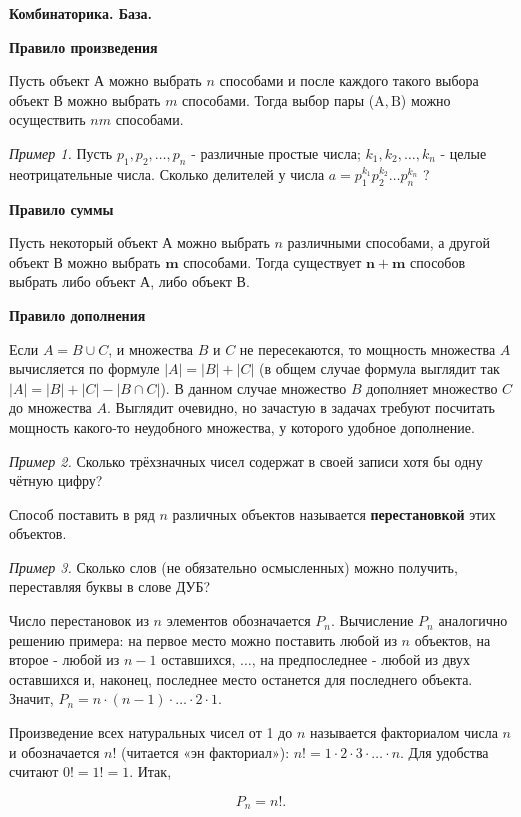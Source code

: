 \centerline{\bf \Huge Комбинаторика. База.}


\textbf{Правило произведения}

Пусть объект А можно выбрать $n$ способами и после каждого такого выбора объект В можно выбрать $m$ способами. Тогда выбор пары ($\mathrm{A}, \mathrm{B}$) можно осуществить $n m$ способами.

\textit{Пример 1.}
Пусть $p_1, p_2, \ldots, p_n$ - различные простые числа; $k_1, k_2, \ldots, k_n$ - целые неотрицательные числа. Сколько делителей у числа $a=p_1^{k_1} p_2^{k_2} \ldots p_n^{k_n}$ ?

\textbf{Правило суммы}

Пусть некоторый объект А можно выбрать $n$ различными способами, а другой объект В можно выбрать $\boldsymbol{m}$ способами. Тогда существует $\boldsymbol{n}+\boldsymbol{m}$ способов выбрать либо объект А, либо объект В.

\textbf{Правило дополнения}

Если $A = B \cup C$, и множества $B$ и $C$ не пересекаются, то мощность множества $A$ вычисляется по формуле $|A| = |B| + |C|$ (в общем случае формула выглядит так $|A| = |B| + |C| - |B\cap C|$). В данном случае множество $B$ дополняет множество $C$ до множества $A$. Выглядит очевидно, но зачастую в задачах требуют посчитать мощность какого-то неудобного множества, у которого удобное дополнение.


\textit{Пример 2.} Сколько трёхзначных чисел содержат в своей записи хотя бы одну чётную цифру?


Способ поставить в ряд $n$ различных объектов называется \textbf{перестановкой} этих объектов.

\textit{Пример 3.} Сколько слов (не обязательно осмысленных) можно получить, переставляя буквы в слове ДУБ?

Число перестановок из $n$ элементов обозначается $P_n$. Вычисление $P_n$ аналогично решению примера: на первое место можно поставить любой из $n$ объектов, на второе - любой из $n-1$ оставшихся, $\ldots$, на предпоследнее - любой из двух оставшихся и, наконец, последнее место останется для последнего объекта. Значит, $P_n=n \cdot(n-1) \cdot \ldots \cdot 2 \cdot 1$.

Произведение всех натуральных чисел от 1 до $n$ называется факториалом числа $n$ и обозначается $n!$ (читается «эн факториал»): $n!=1 \cdot 2 \cdot 3 \cdot \ldots \cdot n$. Для удобства считают $0!=1!=1$. Итак,

$$
P_n=n!.
$$

